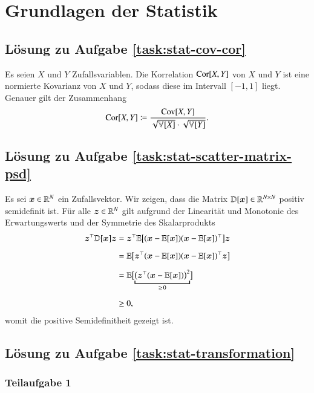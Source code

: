 \section{Grundlagen der Statistik}

\subsection*{Lösung zu Aufgabe \ref{task:stat-cov-cor}}

Es seien $X$ und $Y$ Zufallsvariablen. Die Korrelation $\text{Cor}[X, Y]$ von $X$ und $Y$ ist eine normierte Kovarianz von $X$ und $Y$, sodass diese im Intervall $[-1, 1]$ liegt. Genauer gilt der Zusammenhang
\begin{equation*}
	\text{Cor}[X, Y] \coloneqq \frac{\text{Cov}[X, Y]}{\sqrt{\mathbb{V}[X]} \cdot \sqrt{\mathbb{V}[Y]}}.
\end{equation*} 


\subsection*{Lösung zu Aufgabe \ref{task:stat-scatter-matrix-psd}}

Es sei $\bm{x} \in \mathbb{R}^N$ ein Zufallsvektor. Wir zeigen, dass die Matrix $\mathbb{D}[\bm{x}] \in \mathbb{R}^{N \times N}$ positiv semidefinit ist. Für alle $\bm{z} \in \mathbb{R}^N$ gilt aufgrund der Linearität und Monotonie des Erwartungswerts und der Symmetrie des Skalarprodukts
\begin{align*}
	\bz^\top \D[\bx] \bz
		&= \bz^\top \E\bigl[ (\bx - \E[\bx]) (\bx - \E[\bx])^\top \bigr] \bz
\\[2mm]
		&= \E\bigl[ \bz^\top (\bx - \E[\bx]) (\bx - \E[\bx])^\top \bz \bigr]
\\[2mm]
		&= \E\bigl[ \underbracket{\bigl( \bz^\top (\bx - \E[\bx]) \bigr)^2}_{\ge\,0} \bigr]
\\[2mm]
		&\ge 0,
\end{align*}
womit die positive Semidefinitheit gezeigt ist.


\subsection*{Lösung zu Aufgabe \ref{task:stat-transformation}}

\subsubsection*{Teilaufgabe 1}

